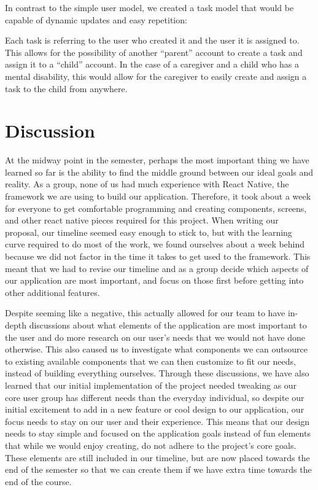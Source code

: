 \documentclass{sigchi}
\begin{document}
In contrast to the simple user model, we created a task model that would be
capable of dynamic updates and easy repetition:

Each task is referring to the user who created it and the user it is assigned
to. This allows for the possibility of another ``parent'' account to create a
task and assign it to a ``child'' account. In the case of a caregiver and a
child who has a mental disability, this would allow for the caregiver to easily
create and assign a task to the child from anywhere.

\section{Discussion}

At the midway point in the semester, perhaps the most important thing we have
learned so  far is the ability to find the middle ground between our ideal goals
and reality. As a group, none of us had much experience with React Native, the
framework we are using to build our application. Therefore, it took about a
week for everyone to get comfortable programming and creating components,
screens, and other react native pieces required for this project. When writing
our proposal, our timeline seemed easy enough to stick to, but with the learning
curve required to do most of the work, we found ourselves about a week behind
because we did not factor in the time it takes to get used to the framework.
This meant that we had to revise our timeline and as a group decide which
aspects of our application are most important, and focus on those first before
getting into other additional features. 

Despite seeming like a negative, this actually allowed for our team to have
in-depth discussions about what elements of the application are most important
to the user and do more research on our user’s needs that we would not have done
otherwise. This also caused us to investigate what components we can outsource
to existing available components that we can then customize to fit our needs,
instead of building everything ourselves. Through these discussions, we have
also learned that our initial implementation of the project needed tweaking as
our core user group has different needs than the everyday individual, so despite
our initial excitement to add in a new feature or cool design to our
application, our focus needs to stay on our user and their experience. This
means that our  design needs to stay simple and focused on the application goals
instead of fun elements that while we would enjoy creating, do not adhere to the
project’s core goals. These elements are still included in our timeline, but are
now placed towards the end of the semester so that we can create them if we have
extra time towards the end of the course.
\end{document}

